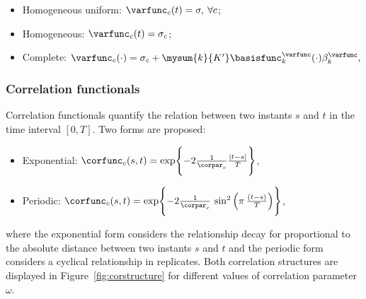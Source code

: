 
\begin{itemize}
\item
  Homogeneous uniform: $\varfunc_c(t) = \sigma, \: \forall c$;
\item
  Homogeneous: $\varfunc_c(t) = \sigma_c$;
\item
  Complete: $  \varfunc_c(\cdot)
  =
  \sigma_c
  +
  \mysum{k}{K^\prime}
  \basisfunc^\varfunc_k(\cdot)
  \beta_k^\varfunc,$
\end{itemize}








\subsubsection{Correlation functionals}
\label{sec:corfunc}

Correlation functionals quantify the relation between two instants $s$ and $t$ in the time interval $[0,T]$. Two forms are proposed:

\begin{itemize}
\item Exponential: $\corfunc_c(s,t) = \exp \Biggl\{-2\frac{1}{\corpar_c} \frac{|t-s|}{T}\Biggr\}$,
\item Periodic: $\corfunc_c(s,t) = \exp\Biggl\{-2\frac{1}{\corpar_c} \, \sin^2 \left(\pi \, \frac{(t-s)}{T} \right)\Biggr\}$,
\end{itemize}

\noindent where the exponential form considers the relationship decay for proportional to the absolute distance between two instants $s$ and $t$ and the periodic form considers a cyclical relationship in replicates. Both correlation structures are displayed in Figure~\ref{fig:corstructure} for different values of correlation parameter $\omega$.





